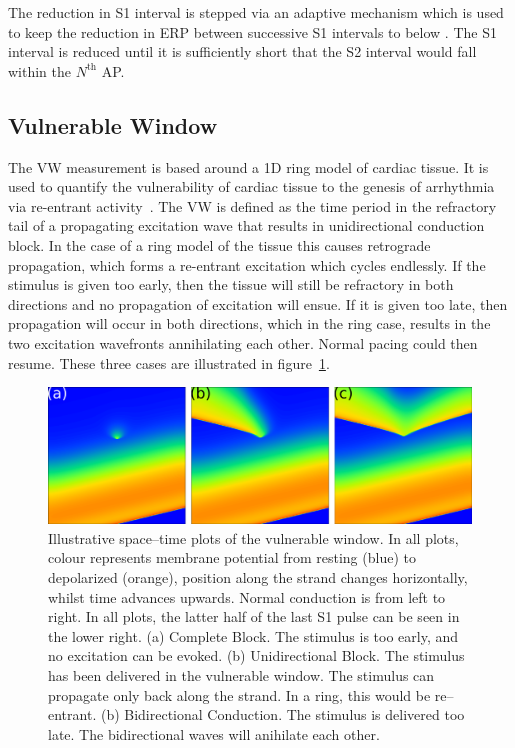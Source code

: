 The reduction in S1 interval is stepped via an adaptive mechanism which is
used to keep the reduction in ERP between successive S1 intervals to below
.  The S1 interval is reduced until it is sufficiently short that the
S2 interval would fall within the $N^{\text{th}}$ AP.

\subsection{Vulnerable Window}

The VW measurement is based around a 1D ring model of cardiac tissue.
It is used to quantify the vulnerability of cardiac tissue to the genesis of
arrhythmia via re-entrant activity~\cite{Quan1990,Zhang2003,Gonzalez2003}.
The VW is defined as the time period in the refractory tail of a propagating
excitation wave that results in unidirectional conduction block.
In the case of a ring model of the tissue this causes retrograde propagation,
which forms a re-entrant excitation which cycles endlessly.
If the stimulus is given too early, then the tissue will still be refractory in
both directions and no propagation of excitation will ensue.
If it is given too late, then propagation will occur in both directions, which
in the ring case, results in the two excitation wavefronts annihilating each
other.
Normal pacing could then resume.
These three cases are illustrated in figure~\ref{fig:toolkit:illus:vw}.


\begin{figure}
\centering
\includegraphics{figures/toolkit/illustrations/vw}
\caption[Illustration of VW cases]{
\label{fig:toolkit:illus:vw}
Illustrative space--time plots of the vulnerable window.
In all plots, colour represents membrane potential from resting (blue) to
depolarized (orange), position along the strand changes horizontally, whilst
time advances upwards.
Normal conduction is from left to right.
In all plots, the latter half of the last S1 pulse can be seen in the lower
right.
(a) Complete Block.  The stimulus is too early, and no excitation can be evoked.
(b) Unidirectional Block.
The stimulus has been delivered in the vulnerable window.
The stimulus can propagate only back along the strand.
In a ring, this would be re--entrant.
(b) Bidirectional Conduction.
The stimulus is delivered too late.
The bidirectional waves will anihilate each other.
}
\end{figure}



